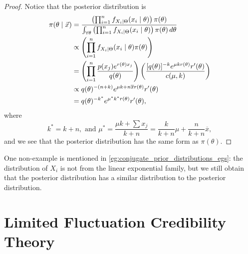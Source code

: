 \documentclass[notoc,notitlepage]{tufte-book}
\begin{document}
\begin{proof}
  Notice that the posterior distribution is
  \begin{align*}
    \pi(\theta \mid \vec{x})
    &= \frac{\left( \prod_{i=1}^{n} f_{X_i \mid \Theta}(x_i \mid \theta) \right)
      \pi(\theta)}{\int_{\forall \theta} \left( \prod_{i=1}^{n} f_{X_i \mid
      \Theta}(x_i \mid \theta) \right) \pi(\theta) \mathop{}\!d{\theta}} \\
    &\propto \left( \prod_{i=1}^{n} f_{X_i \mid \Theta}(x_i \mid \theta)
      \pi(\theta) \right) \\
    &= \left( \prod_{i=1}^{n} \frac{p(x_j)e^{r(\theta) x_j}}{q(\theta)} \right)
      \left( \frac{[q(\theta)]^{-k} e^{\mu kr(\theta)} r'(\theta)}{c(\mu, k)}
      \right) \\
    &\propto q(\theta)^{-(n+k)} e^{\mu k + n \overline{x} r(\theta)} r'(\theta)
    \\
    &= q(\theta)^{-k^*} e^{\mu^* k^* r(\theta)} r'(\theta),
  \end{align*}
  where
  \begin{equation*}
    k^* = k + n, \text{ and } \mu^* = \frac{\mu k + \sum x_j}{k + n} =
    \frac{k}{k + n} \mu + \frac{n}{k + n} \overline{x},
  \end{equation*}
  and we see that the posterior distribution has the same form as
  $\pi(\theta)$.
\end{proof}

\begin{eg}
  One non-example is mentioned in \cref{eg:conjugate_prior_distributions_egs}:
  the distribution of $X_i$ is not from the linear exponential family, but we
  still obtain that the posterior distribution has a similar distribution to the
  posterior distribution.
\end{eg}




\label{part:credibility_theory}

\chapter{Limited Fluctuation Credibility Theory}%
\label{chp:limited_fluctuation_credibility_theory}
\end{document}
